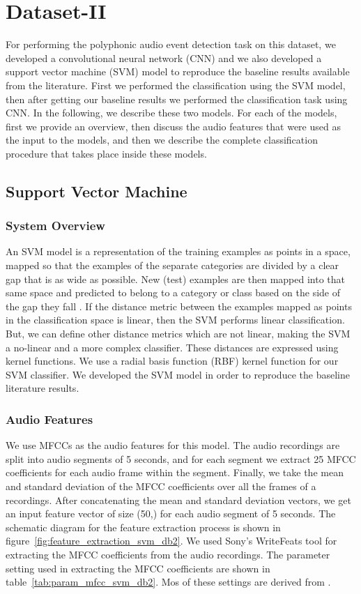 \section{Dataset-II}
For performing the polyphonic audio event detection task on this dataset, we developed a convolutional neural network (CNN) and we also developed a support vector machine (SVM) model to reproduce the baseline results available from the literature. First we performed the classification using the SVM model, then after getting our baseline results we performed the classification task using CNN. In the following, we describe these two models. For each of the models, first we provide an overview, then discuss the audio features that were used as the input to the models, and then we describe the complete classification procedure that takes place inside these models.

\subsection{Support Vector Machine}

\subsubsection{System Overview}
An SVM model is a representation of the training examples as points in a space, mapped so that the examples of the separate categories are divided by a clear gap that is as wide as possible. New (test) examples are then mapped into that same space and predicted to belong to a category or class based on the side of the gap they fall \cite{wiki:xxx}. If the distance metric between the examples mapped as points in the classification space is linear, then the SVM performs linear classification. But, we can define other distance metrics which are not linear, making the SVM a no-linear and a more complex classifier. These distances are expressed using kernel functions. We use a radial basis function (RBF) kernel function for our SVM classifier. We developed the SVM model in order to reproduce the baseline literature results.

\subsubsection{Audio Features} \label{feats_svm}
We use MFCCs as the audio features for this model. The audio recordings are split into audio segments of 5 seconds, and for each segment we extract 25 MFCC coefficients for each audio frame within the segment. Finally, we take the mean and standard deviation of the MFCC coefficients over all the frames of a recordings. After concatenating the mean and standard deviation vectors, we get an input feature vector of size (50,) for each audio segment of 5 seconds. The schematic diagram for the feature extraction process is shown in figure~\ref{fig:feature_extraction_svm_db2}. We used Sony's WriteFeats tool for extracting the MFCC coefficients from the audio recordings. The parameter setting used in extracting the MFCC coefficients are shown in table~\ref{tab:param_mfcc_svm_db2}. Mos of these settings are derived from \cite{kons2013audio}.

